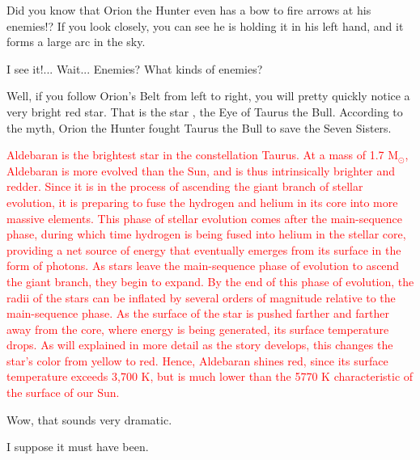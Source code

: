 \documentclass[main.tex]{subfiles}
\begin{document}
\par \Pleione Did you know that Orion the Hunter even has a bow to fire arrows at his enemies!?  If you look closely, you can see he is holding it in his left hand, and it forms a large arc in the sky.

\par \Maia I see it!... Wait... Enemies?  What kinds of enemies?

\par \Pleione Well, if you follow Orion's Belt from left to right, you will pretty quickly notice a very bright red star.  That is the star \rmaldebarran, the Eye of Taurus the Bull.  According to the myth, Orion the Hunter fought Taurus the Bull to save the Seven Sisters.  

\begin{tcolorbox}[sharp corners, colback=red!30, colframe=red!80!blue, title=Aldebaran]
\par \textcolor{red} {Aldebaran is the brightest star in the constellation Taurus.  At a mass of 1.7 M$_{\odot}$, Aldebaran is more evolved than the Sun, and is thus intrinsically brighter and redder.  Since it is in the process of ascending the giant branch of stellar evolution, it is preparing to fuse the hydrogen and helium in its core into more massive elements.  This phase of stellar evolution comes after the main-sequence phase, during which time hydrogen is being fused into helium in the stellar core, providing a net source of energy that eventually emerges from its surface in the form of photons.   As stars leave the main-sequence phase of evolution to ascend the giant branch, they begin to expand.  By the end of this phase of evolution, the radii of the stars can be inflated by several orders of magnitude relative to the main-sequence phase.  As the surface of the star is pushed farther and farther away from the core, where energy is being generated, its surface temperature drops.  As will explained in more detail as the story develops, this changes the star's color from yellow to red.  Hence, Aldebaran shines red, since its surface temperature exceeds 3,700 K, but is much lower than the 5770 K characteristic of the surface of our Sun.}
\end{tcolorbox}

\par \Maia Wow, that sounds very dramatic.

\par \Pleione I suppose it must have been.
\end{document}
